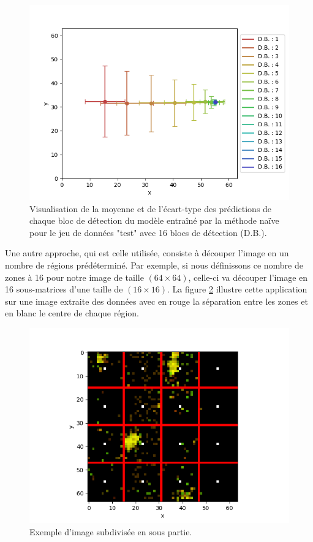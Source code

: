 \begin{figure}[hbt!]
    \centering
    \includegraphics[scale=0.7]{Figures/visulization_prediction_naive_mean_std.png}
    \caption{Visualisation de la moyenne et de l'écart-type des prédictions de chaque bloc de détection du modèle entraîné par la méthode naïve pour le jeu de données "test" avec 16 blocs de détection (D.B.).}
    \label{fig:visulization_prediction_naive_mean_std}
\end{figure}

Une autre approche, qui est celle utilisée, consiste à découper l'image en un nombre de régions prédéterminé. Par exemple, si nous définissons ce nombre de zones à 16 pour notre image de taille $(64 \times 64)$, celle-ci va découper l'image en 16 sous-matrices d'une taille de $(16 \times 16)$. La figure \ref{fig:image_subdivided_like_labels_does} illustre cette application sur une image extraite des données avec en rouge la séparation entre les zones et en blanc le centre de chaque région.

\begin{figure}[hbt!]
    \centering
    \includegraphics[scale=0.7]{Figures/image_subdivided_like_labels_does.png}
    \caption{Exemple d'image subdivisée en sous partie.}
    \label{fig:image_subdivided_like_labels_does}
\end{figure}

